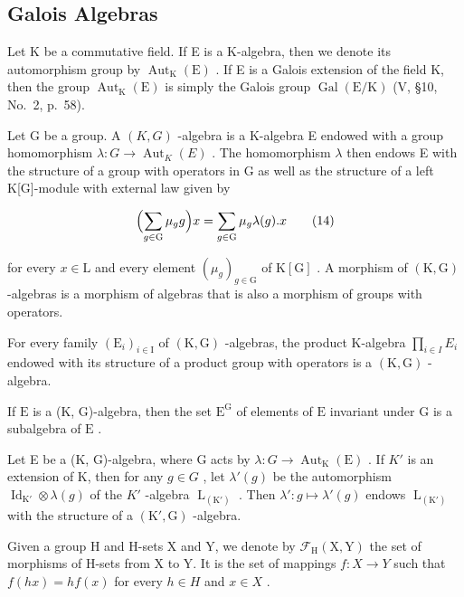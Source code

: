 \subsection{Galois Algebras}

Let K be a commutative field. If E is a K-algebra, then we denote its automorphism group by \(\operatorname{Aut}_{\mathrm{K}}(\mathrm{E})\) . If E is a Galois extension of the field K, then the group \(\operatorname{Aut}_{\mathrm{K}}(\mathrm{E})\) is simply the Galois group \(\operatorname{Gal}(\mathrm{E}/\mathrm{K})\) (V, §10, No.~2, p.~58).

Let G be a group. A \((K,G)\) -algebra is a K-algebra E endowed with a group homomorphism \(\lambda:G\to\operatorname{Aut}_{K}(E)\) . The homomorphism \(\lambda\) then endows E with the structure of a group with operators in G as well as the structure of a left K{[}G{]}-module with external law given by

\[
\Bigl (\sum_ {g \in \mathrm{G}} \mu_ {g} g \Bigr) x = \sum_ {g \in \mathrm{G}} \mu_ {g} \lambda (g). x\tag{14}
\]

for every \(x \in \mathrm{L}\) and every element \((\mu_g)_{g \in \mathrm{G}}\) of \(\mathrm{K}[\mathrm{G}]\) . A morphism of \((\mathrm{K}, \mathrm{G})\) -algebras is a morphism of algebras that is also a morphism of groups with operators.

For every family \((\mathrm{E}_{i})_{i\in\mathrm{I}}\) of \((\mathrm{K},\mathrm{G})\) -algebras, the product K-algebra \(\prod_{i\in I}E_{i}\) endowed with its structure of a product group with operators is a \((\mathrm{K},\mathrm{G})\) -algebra.

If \(\mathrm{E}\) is a (K, G)-algebra, then the set \(\mathrm{E}^{\mathrm{G}}\) of elements of \(\mathrm{E}\) invariant under \(\mathrm{G}\) is a subalgebra of \(\mathrm{E}\) .

Let E be a (K, G)-algebra, where G acts by \(\lambda: G \to \operatorname{Aut}_{\mathrm{K}}(\mathrm{E})\) . If \(K'\) is an extension of K, then for any \(g \in G\) , let \(\lambda'(g)\) be the automorphism \(\operatorname{Id}_{\mathrm{K}'} \otimes \lambda(g)\) of the \(K'\) -algebra \(\operatorname{L}_{(\mathrm{K}')}\) . Then \(\lambda': g \mapsto \lambda'(g)\) endows \(\operatorname{L}_{(\mathrm{K}')}\) with the structure of a \((\mathrm{K}', \mathrm{G})\) -algebra.

Given a group H and H-sets X and Y, we denote by \(\mathcal{F}_{\mathrm{H}}(\mathrm{X},\mathrm{Y})\) the set of morphisms of H-sets from X to Y. It is the set of mappings \(f:X\to Y\) such that \(f(hx)=hf(x)\) for every \(h\in H\) and \(x\in X\) .

